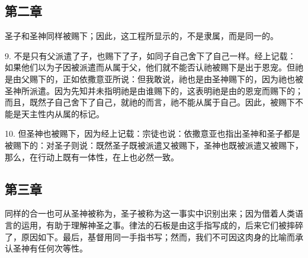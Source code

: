 
\subsection{第二章}

圣子和圣神同样被赐下；因此，这工程所显示的，不是隶属，而是同一的。\par

9. 不是只有父派遣了子，也赐下了子，如同子自己舍下了自己一样。经上记载：如果他们以为子因被派遣而从属于父，他们就不能否认祂被赐下是出于恩宠。但祂是由父赐下的，正如依撒意亚所说：但我敢说，祂也是由圣神赐下的，因为祂也被圣神所派遣。因为先知并未指明祂是由谁赐下的，这表明祂是由的恩宠而赐下的；而且，既然子自己舍下了自己，就祂的而言，祂不能从属于自己。因此，被赐下不能是天主性内从属的标记。\par

10. 但圣神也被赐下，因为经上记载：宗徒也说：依撒意亚也指出圣神和圣子都是被赐下的：对圣子则说：既然圣子既被派遣又被赐下，圣神也既被派遣又被赐下，那么，在行动上既有一体性，在上也必然一致。\par


\subsection{第三章}

同样的合一也可从圣神被称为，圣子被称为这一事实中识别出来；因为借着人类语言的运用，有助于理解神圣之事。律法的石板是由这手指写成的，后来它们被摔碎了，原因如下。最后，基督用同一手指书写；然而，我们不可因这肉身的比喻而承认圣神有任何次等性。\par


